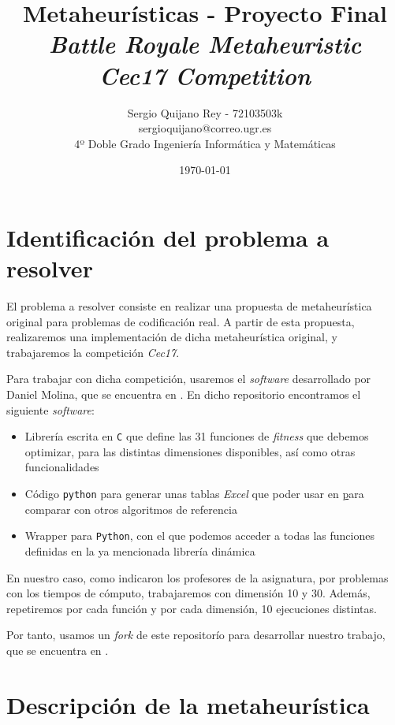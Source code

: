 \documentclass[11pt]{article}
\title{
    {Metaheurísticas - Proyecto Final}\\
    {\emph{Battle Royale Metaheuristic}}\\
    {\emph{Cec17 Competition}}
}
\author{
    {Sergio Quijano Rey - 72103503k}\\
    {sergioquijano@correo.ugr.es} \\
    {4º Doble Grado Ingeniería Informática y Matemáticas}
}
\date{\today}
\begin{document}
\maketitle
\pagebreak

\tableofcontents

\listoffigures

\listoftables

\pagebreak
\section{Identificación del problema a resolver}

El problema a resolver consiste en realizar una propuesta de metaheurística original para problemas de codificación real. A partir de esta propuesta, realizaremos una implementación de dicha metaheurística original, y trabajaremos la competición \emph{Cec17}.

Para trabajar con dicha competición, usaremos el \emph{software} desarrollado por Daniel Molina, que se encuentra en \cite{daniel_repo:online}. En dicho repositorio encontramos el siguiente \emph{software}:

\begin{itemize}
    \item Librería escrita en \lstinline{C} que define las 31 funciones de \emph{fitness} que debemos optimizar, para las distintas dimensiones disponibles, así como otras funcionalidades
    \item Código \lstinline{python} para generar unas tablas \emph{Excel} que poder usar en \href{tacolab.org} para comparar con otros algoritmos de referencia
    \item Wrapper para \lstinline{Python}, con el que podemos acceder a todas las funciones definidas en la ya mencionada librería dinámica
\end{itemize}

En nuestro caso, como indicaron los profesores de la asignatura, por problemas con los tiempos de cómputo, trabajaremos con dimensión 10 y 30. Además, repetiremos por cada función y por cada dimensión, 10 ejecuciones distintas.

Por tanto, usamos un \emph{fork} de este repositorío para desarrollar nuestro trabajo, que se encuentra en \cite{repositorio:online}.

\pagebreak
\section{Descripción de la metaheurística}
\end{document}
